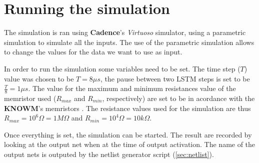 \section{Running the simulation}\label{sec:run}

The simulation is ran using \textbf{Cadence}'s \textit{Virtuoso} simulator, using a parametric simulation to simulate all the inputs. The use of the parametric simulation allows to change the values for the data we want to use as input.

In order to run the simulation some variables need to be set. The time step ($T$) value was chosen to be $T=8\mu s$, the pause between two \ac{LSTM} steps is set to be $\frac{T}{8}=1\mu s$. The value for the maximum and minimum resistances value of the memristor used ($R_{max}$ and $R_{min}$, respectively) are set to be in acordance with the \textbf{KNOWM}\textregistered{}'s memristors \cite{Knowm}. The resistance values used for the simulation are thus $R_{max}=10^6 \Omega=1M\Omega$ and $R_{min}=10^4 \Omega = 10k\Omega$.

Once everything is set, the simulation can be started. The result are recorded by looking at the output net when at the time of output activation. The name of the output nets is outputed by the netlist generator script (\cref{sec:netlist}).
